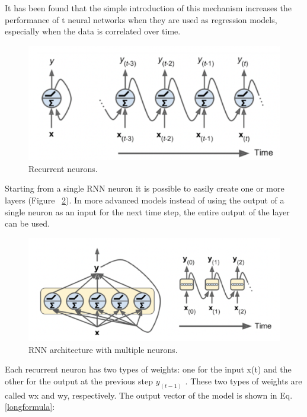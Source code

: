 It has been found that the simple introduction of this mechanism increases the performance of t neural networks when they are used as regression models, especially when the data is correlated over time. 

\begin{figure} [h]
    \centering
    \includegraphics[width=\textwidth,height=\textheight,keepaspectratio]{Assets/Theory_and_methods/unnamed-6.png}
    \caption{Recurrent neurons.}
    \label{fig:Recurrent_neurons}
\end{figure}

Starting from a single RNN neuron it is possible to easily create one or more layers (Figure ~\ref{fig:RNN_multi_layer}). In more advanced models instead of using the output of a single neuron as an input for the next time step, the entire output of the layer can be used.

\begin{figure} [h]
    \centering
    \includegraphics[width=\textwidth,height=\textheight,keepaspectratio]{Assets/Theory_and_methods/unnamed-7.png}
    \caption{RNN architecture with multiple neurons.}
    \label{fig:RNN_multi_layer}
\end{figure}

Each recurrent neuron has two types of weights: one for the input x(t) and the other for the output at the previous step $y_{(t-1)}$ . These two types of weights are called wx and wy, respectively. The output vector of the model is shown in Eq. \eqref{longformula}:

